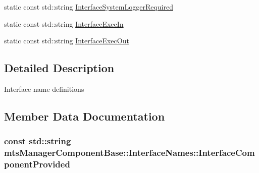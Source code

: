 \begin{DoxyCompactItemize}
\item 
static const std\+::string \hyperlink{classmts_manager_component_base_1_1_interface_names_ac9a7050301a0c9b7a3f91b8b5655d209}{Interface\+System\+Logger\+Required}
\item 
static const std\+::string \hyperlink{classmts_manager_component_base_1_1_interface_names_af3b8c25884d04f284baeb57265124743}{Interface\+Exec\+In}
\item 
static const std\+::string \hyperlink{classmts_manager_component_base_1_1_interface_names_a6c03e2f64b187041b1ed618725460f92}{Interface\+Exec\+Out}
\end{DoxyCompactItemize}


\subsection{Detailed Description}
Interface name definitions 

\subsection{Member Data Documentation}
\hypertarget{classmts_manager_component_base_1_1_interface_names_a7a409f1497301d9bbee5d6d0fea401c7}{}
\subsubsection[{Interface\+Component\+Provided}]{\setlength{\rightskip}{0pt plus 5cm}const std\+::string mts\+Manager\+Component\+Base\+::\+Interface\+Names\+::\+Interface\+Component\+Provided\hspace{0.3cm}{\ttfamily [static]}}\label{classmts_manager_component_base_1_1_interface_names_a7a409f1497301d9bbee5d6d0fea401c7}
\hypertarget{classmts_manager_component_base_1_1_interface_names_a7a33d7dcfd76e820ca863b14b6931b77}{}
